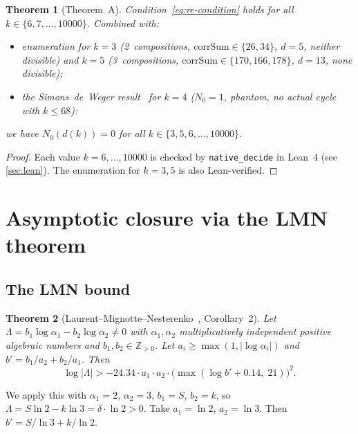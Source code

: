 \documentclass[11pt, a4paper]{amsart}
\theoremstyle{plain}
\newtheorem{theorem}{Theorem}[section]
\theoremstyle{definition}
\theoremstyle{remark}
\newcommand{\Z}{\mathbb{Z}}
\newcommand{\corrSum}{\mathrm{corrSum}}
\begin{document}
\begin{theorem}[Theorem~A]\label{thm:finite}
  Condition~\eqref{eq:re-condition} holds for all
  $k \in \{6, 7, \ldots, 10000\}$.
  Combined with:
  \begin{itemize}
    \item enumeration for $k = 3$ (2~compositions,
      $\corrSum \in \{26, 34\}$, $d = 5$, neither
      divisible) and $k = 5$ (3~compositions,
      $\corrSum \in \{170, 166, 178\}$, $d = 13$,
      none divisible);
    \item the Simons--de~Weger result~\cite{SimonsDeWeger2005}
      for $k = 4$ ($N_0 = 1$, phantom, no actual cycle
      with $k \leq 68$):
  \end{itemize}
  we have $N_0(d(k)) = 0$ for all
  $k \in \{3, 5, 6, \ldots, 10000\}$.
\end{theorem}

\begin{proof}
  Each value $k = 6, \ldots, 10000$ is checked by
  \texttt{native\_decide} in Lean~4 (see \cref{sec:lean}).
  The enumeration for $k = 3, 5$ is also Lean-verified.
\end{proof}

\section{Asymptotic closure via the LMN theorem}\label{sec:baker}

\subsection{The LMN bound}\label{ssec:lmn}

\begin{theorem}[Laurent--Mignotte--Nesterenko~\cite{LMN1995},
  Corollary~2]\label{thm:lmn}
  Let $\Lambda = b_1 \log \alpha_1 - b_2 \log \alpha_2 \neq 0$
  with $\alpha_1, \alpha_2$ multiplicatively independent positive
  algebraic numbers and $b_1, b_2 \in \Z_{>0}$.
  Let $a_i \geq \max(1, |\log \alpha_i|)$ and
  $b' = b_1/a_2 + b_2/a_1$.  Then
  \begin{equation}\label{eq:lmn-full}
    \log|\Lambda| > -24.34 \cdot a_1 \cdot a_2
    \cdot \bigl(\max(\log b' + 0.14,\; 21)\bigr)^2.
  \end{equation}
\end{theorem}

We apply this with $\alpha_1 = 2$, $\alpha_2 = 3$,
$b_1 = S$, $b_2 = k$, so
$\Lambda = S \ln 2 - k \ln 3 = \delta \cdot \ln 2 > 0$.
Take $a_1 = \ln 2$, $a_2 = \ln 3$.  Then
$b' = S/\ln 3 + k/\ln 2$.
\end{document}
